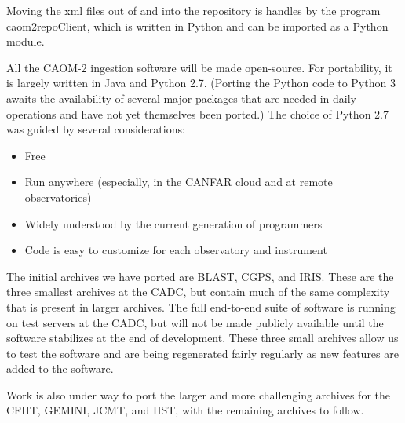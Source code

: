 Moving the xml files out of and into the repository is handles by the program caom2repoClient, which is written in Python and can be imported as a Python module.
 
All the CAOM-2 ingestion software will be made open-source.  For portability, it is largely written in Java and Python 2.7.  (Porting the Python code to Python 3 awaits the availability of several major packages that are needed in daily operations and have not yet themselves been ported.) 
The choice of Python 2.7 was guided by several considerations:
\begin{itemize}
\item Free
\item Run anywhere (especially, in the CANFAR cloud and at remote observatories)
\item Widely understood by the current generation of programmers
\item Code is easy to customize for each observatory and instrument
\end{itemize}

The initial archives we have ported are BLAST, CGPS, and IRIS.  These are the three smallest archives at the CADC, but contain much of the same complexity that is present in larger archives.  The full end-to-end suite of software is running on test servers at the CADC, but will not be made publicly available until the software stabilizes at the end of development.  These three small archives allow us to test the software and are being regenerated fairly regularly as new features are added to the software.

Work is also under way to port the larger and more challenging archives for the CFHT, GEMINI, JCMT, and HST, with the remaining archives to follow.


